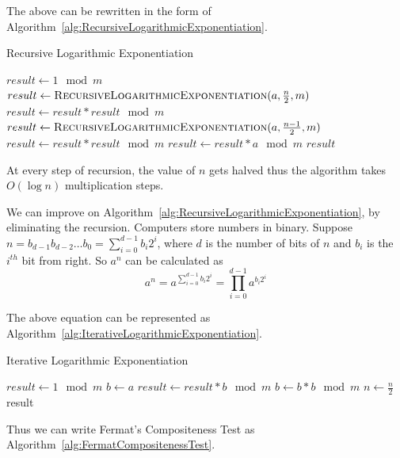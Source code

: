 \documentclass[11pt]{article}
\begin{document}
The above can be rewritten in the form of Algorithm~\ref{alg:RecursiveLogarithmicExponentiation}.

\begin{algorithm}
\caption{Recursive Logarithmic Exponentiation}
\label{alg:RecursiveLogarithmicExponentiation}
\begin{algorithmic}
\State $result \gets 1 \mod m$ 
	\State $result \gets \Call{RecursiveLogarithmicExponentiation}{a, \frac n 2, m}$
	\State $result \gets result * result \mod m$ 
	\State $result \gets \Call{RecursiveLogarithmicExponentiation}{a, \frac {n-1} 2, m}$
	\State $result \gets result * result \mod m$
	\State $result \gets result * a \mod m$
\EndIf
\State \Return $result$
\EndProcedure
\end{algorithmic}
\end{algorithm}

At every step of recursion, the value of $n$ gets halved thus the algorithm takes $O(\log n)$ multiplication steps.

We can improve on Algorithm~\ref{alg:RecursiveLogarithmicExponentiation}, by eliminating the recursion. Computers store numbers in binary. Suppose $n = b_{d-1}b_{d-2}\dots b_{0} = \sum_{i=0}^{d-1}b_i 2^i$, where $d$ is the number of bits of $n$ and $b_i$ is the $i^{th}$ bit from right. So $a^n$ can be calculated as
\[a^n = a^{\sum_{i=0}^{d-1}b_i 2^i} = \prod_{i=0}^{d-1} a^{b_i 2^i}\]

The above equation can be represented as Algorithm~\ref{alg:IterativeLogarithmicExponentiation}.

\begin{algorithm}
\caption{Iterative Logarithmic Exponentiation}
\label{alg:IterativeLogarithmicExponentiation}
\begin{algorithmic}
\State $result \gets 1 \mod m$ 
\State $b \gets a$
 
	\State $result \gets result * b \mod m$ 
\EndIf
\State $b \gets b * b \mod m$ 
\State $n \gets \frac n 2$ 
\EndWhile \label{euclidendwhile}
\State \Return result
\EndProcedure
\end{algorithmic}
\end{algorithm}
Thus we can write Fermat's Compositeness Test as Algorithm~\ref{alg:FermatCompositenessTest}.
\end{document}

